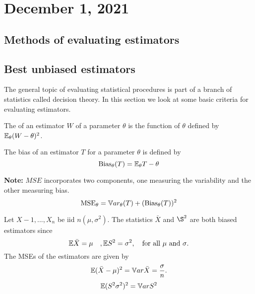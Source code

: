 \section{December 1, 2021}
\subsection{Methods of evaluating estimators}
\subsection{Best unbiased estimators}
The general topic of evaluating statistical procedures is part of a branch of statistics called decision theory. In this section we look at some basic criteria for evaluating estimators.
    
\begin{definition}
    The  of an estimator $W$ of a parameter $\theta$ is the function of $\theta$ defined by $\mathbb E_{\theta}(W-\theta)^2$.
\end{definition}

\begin{definition}[Bias]
    The bias of an estimator $T$ for a parameter $\theta$ is defined by 
    $$
    \text{Bias}_{\theta}(T) = \mathbb E_{\theta}T -\theta
    $$
\end{definition}
\textbf{Note:} $MSE$ incorporates two components, one measuring the variability and the other measuring bias.
$$
\text{MSE}_{\theta} = \mathbb V ar_{\theta}(T) + (\text{Bias}_{\theta}(T))^2
$$
\begin{example}
    Let $X-1,...,X_n$ be iid $n(\mu,\sigma^2)$. The statistics $\bar{X}$ and $\S^2$ are both biased estimators since
    $$
    \mathbb E \bar{X} = \mu \quad, \mathbb E S^2 = \sigma^2, \quad \text{for all $\mu$ and $\sigma$}.
    $$
    The MSEs of the estimators are given by
    $$
    \mathbb E(\bar{X} - \mu)^2 = \mathbb V ar \bar{X} = \frac{\sigma}{n}.
    $$
    $$
    \mathbb E(S^2 \sigma^2)^2 = \mathbb V ar S^2
    $$
\end{example}